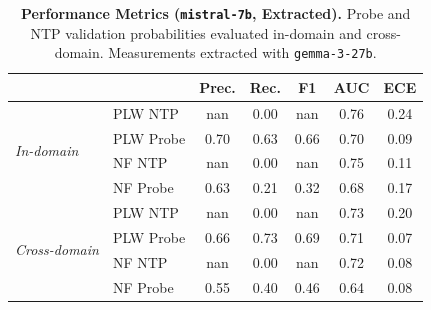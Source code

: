 \begin{table}[ht]
\centering
\begin{tabular}{ll ccccc}
\toprule
& & Prec. & Rec. & F1 & AUC & ECE \\
\midrule
\multirow{4}{*}{\textit{In-domain}}
& PLW NTP & nan & 0.00 & nan & 0.76 & 0.24 \\
& PLW Probe & 0.70 & 0.63 & 0.66 & 0.70 & 0.09 \\
& NF NTP & nan & 0.00 & nan & 0.75 & 0.11 \\
& NF Probe & 0.63 & 0.21 & 0.32 & 0.68 & 0.17 \\
\midrule
\multirow{4}{*}{\textit{Cross-domain}}
& PLW NTP & nan & 0.00 & nan & 0.73 & 0.20 \\
& PLW Probe & 0.66 & 0.73 & 0.69 & 0.71 & 0.07 \\
& NF NTP & nan & 0.00 & nan & 0.72 & 0.08 \\
& NF Probe & 0.55 & 0.40 & 0.46 & 0.64 & 0.08 \\
\bottomrule
\end{tabular}
\caption{\textbf{Performance Metrics (\texttt{mistral-7b}, Extracted).} Probe and NTP validation probabilities evaluated in-domain and cross-domain. Measurements extracted with \texttt{gemma-3-27b}.}
\label{tab:mistral-7b-gemma-3-27b-head-real}
\end{table}
